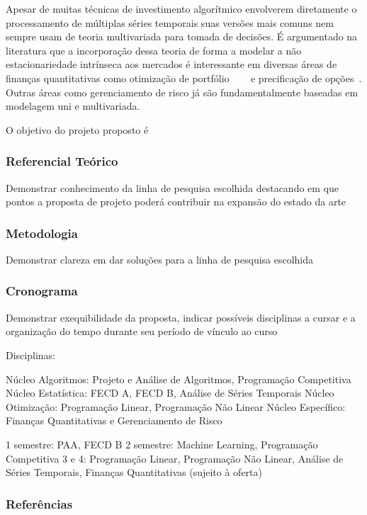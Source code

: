 \documentclass{article}
\begin{document}
Apesar de muitas técnicas de investimento algorítmico envolverem diretamente o
processamento de múltiplas séries temporais suas versões mais comuns nem sempre
usam de teoria multivariada para tomada de decisões. É argumentado na
literatura que a incorporação dessa teoria de forma a modelar a não
estacionariedade intrínseca aos mercados é interessante em diversas áreas de
finanças quantitativas como otimização de portfólio~\cite{procacci}
~\cite{luo}~\cite{cenario_generation} e precificação de opções~\cite{chorro}.
Outras áreas como gerenciamento de risco já são fundamentalmente baseadas em
modelagem uni e multivariada.

O objetivo do projeto proposto é


\subsubsection*{Referencial Teórico}

Demonstrar conhecimento da linha de pesquisa escolhida destacando em que
pontos a proposta de projeto poderá contribuir na expansão do estado da arte

\subsubsection*{Metodologia}

Demonstrar clareza em dar soluções para a linha de pesquisa escolhida

\subsubsection*{Cronograma}

Demonstrar exequibilidade da proposta, indicar possíveis disciplinas a cursar
e a organização do tempo durante seu período de vínculo ao curso

Disciplinas:

Núcleo Algoritmos: Projeto e Análise de Algoritmos, Programação Competitiva
Núcleo Estatística: FECD A, FECD B, Análise de Séries Temporais
Núcleo Otimização: Programação Linear, Programação Não Linear
Núcleo Específico: Finanças Quantitativas e Gerenciamento de Risco

1 semestre: PAA, FECD B
2 semestre: Machine Learning, Programação Competitiva
3 e 4: Programação Linear, Programação Não Linear, Análise de Séries Temporais,
Finanças Quantitativas (sujeito à oferta)

\subsubsection*{Referências}
\end{document}
